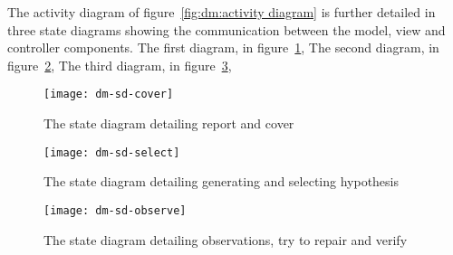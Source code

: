The activity diagram of figure~\ref{fig:dm:activity diagram} is further detailed
in three state diagrams showing the communication between the model, view and
controller components. The first diagram, in figure~\ref{fig:dm:sd cover}, %
The second diagram, in figure~\ref{fig:dm:sd select}, %
The third diagram, in figure~\ref{fig:dm:sd observe}, %

\begin{figure}[htbp]
    \centering
    \texttt{[image: dm-sd-cover]}
    \caption{The state diagram detailing report and cover}
    \label{fig:dm:sd cover}
\end{figure}

\begin{figure}[htbp]
    \centering
    \texttt{[image: dm-sd-select]}
    \caption{The state diagram detailing generating and selecting hypothesis}
    \label{fig:dm:sd select}
\end{figure}

\begin{figure}[htbp]
    \centering
    \texttt{[image: dm-sd-observe]}
    \caption{The state diagram detailing observations, try to repair and verify}
    \label{fig:dm:sd observe}
\end{figure}
